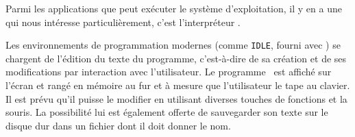 {\begin{minipage}{\myparboxwidth}
Parmi les applications que peut exécuter le système d'exploitation, 
il y en a une qui nous intéresse particulièrement, c'est l'interpréteur \python.

Les environnements de programmation modernes (comme {\tt IDLE}, fourni avec \python) 
se chargent de l'édition du texte du
programme, c'est-à-dire de sa création et de ses modifications
par interaction avec l'utilisateur. Le 
programme \python\ est affiché sur l'écran et rangé en mémoire 
au fur et à mesure que
l'utilisateur le tape au clavier. Il est prévu qu'il puisse le modifier
en utilisant diverses touches de fonctions et la souris. La possibilité
lui est également offerte de sauvegarder son texte sur le disque dur
dans un fichier dont il doit donner le nom.

\vspace{\abovedisplayskip}
\end{minipage}
}

